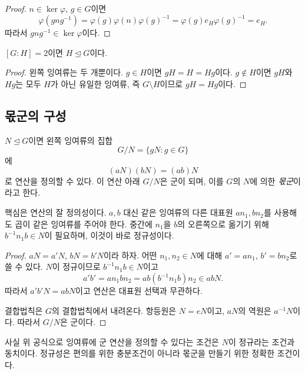 \begin{proof}
$n\in\ker\varphi$, $g\in G$이면
\[
  \varphi(gng^{-1})
  =\varphi(g)\varphi(n)\varphi(g)^{-1}
  =\varphi(g)e_H\varphi(g)^{-1}=e_H.
\]
따라서 $gng^{-1}\in\ker\varphi$이다.
\end{proof}

\begin{proposition}[지표 $2$인 부분군]
$[G:H]=2$이면 $H\trianglelefteq G$이다.
\end{proposition}

\begin{proof}
왼쪽 잉여류는 두 개뿐이다. $g\in H$이면 $gH=H=Hg$이다. $g\notin H$이면 $gH$와 $Hg$는 모두 $H$가 아닌 유일한 잉여류, 즉 $G\setminus H$이므로 $gH=Hg$이다.
\end{proof}

\subsection{몫군의 구성}

\begin{theorem}[몫군]
$N\trianglelefteq G$이면 왼쪽 잉여류의 집합
\[
  G/N=\{gN:g\in G\}
\]
에
\[
  (aN)(bN)=(ab)N
\]
로 연산을 정의할 수 있다. 이 연산 아래 $G/N$은 군이 되며, 이를 $G$의 $N$에 의한 \emph{몫군}이라고 한다.
\end{theorem}

\begin{proofidea}
핵심은 연산의 잘 정의성이다. $a,b$ 대신 같은 잉여류의 다른 대표원 $an_1,bn_2$를 사용해도 곱이 같은 잉여류를 주어야 한다. 중간에 $n_1$을 $b$의 오른쪽으로 옮기기 위해 $b^{-1}n_1b\in N$이 필요하며, 이것이 바로 정규성이다.
\end{proofidea}

\begin{proof}
$aN=a'N$, $bN=b'N$이라 하자. 어떤 $n_1,n_2\in N$에 대해 $a'=an_1$, $b'=bn_2$로 쓸 수 있다. $N$이 정규이므로 $b^{-1}n_1b\in N$이고
\[
  a'b'=an_1bn_2
  =ab(b^{-1}n_1b)n_2\in abN.
\]
따라서 $a'b'N=abN$이고 연산은 대표원 선택과 무관하다.

결합법칙은 $G$의 결합법칙에서 내려온다. 항등원은 $N=eN$이고, $aN$의 역원은 $a^{-1}N$이다. 따라서 $G/N$은 군이다.
\end{proof}

\begin{remark}
사실 위 공식으로 잉여류에 군 연산을 정의할 수 있다는 조건은 $N$이 정규라는 조건과 동치이다. 정규성은 편의를 위한 충분조건이 아니라 몫군을 만들기 위한 정확한 조건이다.
\end{remark}

